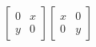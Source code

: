 \documentclass{minimal}
\begin{document}
    $ \left[
    \begin{smallmatrix}
        0 & x \\
        y & 0
    \end{smallmatrix}
    \right]
    \left[
    \begin{smallmatrix}
        x & 0 \\
        0 & y
    \end{smallmatrix}
    \right] $
\end{document}

